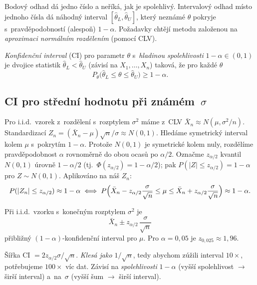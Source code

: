 \documentclass[11pt,a4paper]{article}
\begin{document}
Bodový odhad dá jedno číslo a neříká, jak je spolehlivý. Intervalový odhad místo jednoho čísla dá náhodný interval $[\hat\theta_L,\hat\theta_U]$, který neznámé $\theta$ pokryje s~pravděpodobností (alespoň) $1-\alpha$. Požadavky chtějí metodu založenou na \emph{aproximaci normálním rozdělením} (pomocí CLV).

\begin{definice}
\emph{Konfidenční interval} (CI) pro parametr $\theta$ s~\emph{hladinou spolehlivosti} $1-\alpha\in(0,1)$ je dvojice statistik $\hat\theta_L<\hat\theta_U$ (závisí na $X_1,\dots,X_n$) taková, že pro každé $\theta$
\[
P_\theta\bigl(\hat\theta_L\le\theta\le\hat\theta_U\bigr)\ge 1-\alpha.
\]
\end{definice}

\subsection{\texorpdfstring{CI pro střední hodnotu při známém~$\sigma$}{CI pro střední hodnotu při známém sigma}}

Pro i.i.d.\ vzorek z~rozdělení s~rozptylem $\sigma^2$ máme z~CLV $\bar X_n\approx N(\mu,\sigma^2/n)$. Standardizací
\(
Z_n=(\bar X_n-\mu)\sqrt{n}/\sigma\approx N(0,1).
\)
Hledáme symetrický interval kolem $\mu$ s~pokrytím $1-\alpha$. Protože $N(0,1)$ je symetrické kolem nuly, rozdělíme  pravděpodobnost $\alpha$ rovnoměrně do obou ocasů po $\alpha/2$. Označme $z_{\alpha/2}$ kvantil $N(0,1)$ úrovně $1-\alpha/2$ (tj.\ $\Phi(z_{\alpha/2})=1-\alpha/2$); pak $P(|Z|\le z_{\alpha/2})=1-\alpha$ pro $Z\sim N(0,1)$. Aplikováno na náš $Z_n$:
\[
P(|Z_n|\le z_{\alpha/2})\approx 1-\alpha\;\Longleftrightarrow\;P\Bigl(\bar X_n-z_{\alpha/2}\frac{\sigma}{\sqrt n}\le\mu\le\bar X_n+z_{\alpha/2}\frac{\sigma}{\sqrt n}\Bigr)\approx 1-\alpha.
\]

\begin{veta}
Při i.i.d.\ vzorku s~konečným rozptylem $\sigma^2$ je
\[
\bar X_n\pm z_{\alpha/2}\,\frac{\sigma}{\sqrt n}
\]
přibližný $(1-\alpha)$-konfidenční interval pro $\mu$. Pro $\alpha=0{,}05$ je $z_{0{,}025}\approx 1{,}96$.
\end{veta}

\begin{intuice}
Šířka CI $=2z_{\alpha/2}\sigma/\sqrt n$. \emph{Klesá jako $1/\sqrt n$}, tedy abychom zúžili interval $10\times$, potřebujeme $100\times$ víc dat. Závisí na \emph{spolehlivosti} $1-\alpha$ (vyšší spolehlivost $\to$ širší interval) a~na~$\sigma$ (vyšší šum $\to$ širší interval).
\end{intuice}
\end{document}
